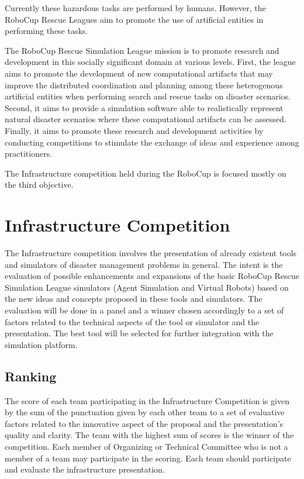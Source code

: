 \documentclass{article}
\begin{document}
Currently these hazardous tasks are performed by humans. However, the RoboCup Rescue Leagues aim to promote the use of artificial entities in performing these tasks.

The RoboCup Rescue Simulation League mission is to promote research and development in this socially significant domain at various levels. First, the league aims to promote the development of new computational artifacts that may improve the distributed coordination and planning among these heterogenous artificial entities when performing search and rescue tasks on disaster scenarios. Second, it aims to provide a simulation software able to realistically represent natural disaster scenarios where these computational artifacts can be assessed. Finally, it aims to promote these research and development activities by conducting competitions to stimulate the exchange of ideas and experience among practitioners.

The Infrastructure competition held during the RoboCup is focused mostly on the third objective.
\section{Infrastructure Competition}
\label{sec:infrastructure}
The Infrastructure competition involves the presentation of already existent tools and simulators of disaster management problems in general. The intent is the evaluation of possible enhancements and expansions of the basic RoboCup Rescue Simulation League simulators (Agent Simulation and Virtual Robots) based on the new ideas and concepts proposed in these tools and simulators. The evaluation will be done in a panel and a winner chosen accordingly to a set of factors related to the technical aspects of the tool or simulator and the presentation. The best tool will be selected for further integration with the simulation platform.
\subsection{Ranking}
The score of each team participating in the Infrastructure Competition is given by the sum of the punctuation given by each other team to a set of evaluative factors related to the innovative aspect of the proposal and the presentation's quality and clarity. The team with the highest sum of scores is the winner of the competition. Each member of Organizing or Technical Committee who is not a member of a team may participate in the scoring. Each team should participate and evaluate the infrastructure presentation.
\end{document}
